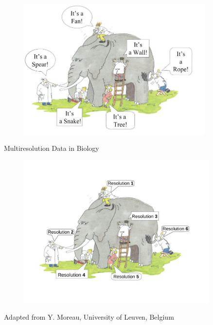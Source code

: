 \documentclass[first=dgreen,second=purple,logo=redexc]{aaltoslides}
\begin{document}
\begin{frame} {} 

\begin{figure}
\centering
  \includegraphics[trim=0cm 0.5cm 0.5cm 0cm, clip=true,width=0.88\textwidth]{figures/elephant}
\end{figure}

\end{frame}
\begin{frame} {Multiresolution Data in Biology} 

\begin{figure}
\centering
  \includegraphics[trim=1cm 2.3cm 0.5cm 2cm, clip=true,width=0.9\textwidth]{figures/eleres}
\end{figure}

\tiny Adapted from Y. Moreau, University of Leuven, Belgium

\end{frame}
\end{document}
